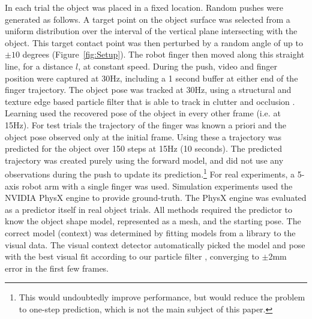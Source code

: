 In each trial the object was placed in a fixed location. Random pushes were generated as follows. A target point on the object surface was selected from a uniform distribution over the interval of the vertical plane intersecting with the object. This target contact point was then perturbed by a random angle of up to $\pm 10$ degrees (Figure~\ref{fig:Setup}). The robot finger then moved along this straight line, for a distance $l$, at constant speed. During the push, video and finger position were captured at 30Hz, including a 1 second buffer at either end of the finger trajectory. The object pose was tracked at 30Hz, using a structural and texture edge based particle filter that is able to track in clutter and occlusion \citep{morwald_edge_2009}. Learning used the recovered pose of the object in every other frame (i.e. at 15Hz). For test trials the trajectory of the finger was known a priori and the object pose observed only at the initial frame. Using these a trajectory was predicted for the object over 150 steps at 15Hz (10 seconds). The predicted trajectory was created purely using the forward model, and did not use any observations during the push to update its prediction.\footnote{This would undoubtedly improve performance, but would reduce the problem to one-step prediction, which is not the main subject of this paper.} For real experiments, a 5-axis robot arm with a single finger was used. Simulation experiments used the NVIDIA PhysX engine \citep{nvidia_physx} to provide ground-truth. The PhysX engine was evaluated as a predictor itself in real object trials. All methods required the predictor to know the object shape model, represented as a mesh, and the starting pose. The correct model (context) was determined by fitting models from a library to the visual data. The visual context detector automatically picked the model and pose with the best visual fit according to our particle filter \citep{morwald_edge_2009}, converging to $\pm$2mm error in the first few frames. 

